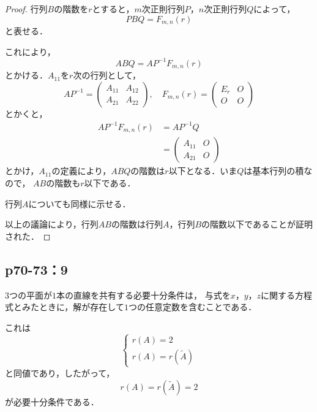 \documentclass[uplatex,dvipdfmx,a4paper,11pt,fleqn]{jsarticle}
\begin{document}
\begin{leftbar}
    \begin{proof}
        行列$B$の階数を$r$とすると，$m$次正則行列$P$，$n$次正則行列$Q$によって，
        \[
            P B Q = F_{m,n} (r)
        \]
        と表せる．

        これにより，
        \[
            ABQ = A P^{-1} F_{m,n} (r) 
        \]
        とかける．$A_{11}$を$r$次の行列として，
        \[
            A P^{-1} = \begin{pmatrix} A_{11} & A_{12} \\ A_{21} & A_{22} \end{pmatrix}, \quad F_{m,n} (r) = \begin{pmatrix} E_r & O \\ O & O \end{pmatrix}
        \]
        とかくと，
        \begin{align*}
           A P^{-1} F_{m,n} (r)&= A P^{-1} Q \\
           & = \begin{pmatrix} A_{11}& O \\ A_{21} & O \end{pmatrix}
        \end{align*}
        とかけ，$A_{11}$の定義により，$ABQ$の階数は$r$以下となる．いま$Q$は基本行列の積なので， $AB$の階数も$r$以下である．

        行列$A$についても同様に示せる．
        
        以上の議論により，行列$AB$の階数は行列$A$，行列$B$の階数以下であることが証明された．

    \end{proof}
\end{leftbar}

\newpage 


\subsection*{p70-73：9}

\begin{tleftbar}
    $3$つの平面が$1$本の直線を共有する必要十分条件は，
    与式を$x$，$y$，$z$に関する方程式とみたときに，解が存在して$1$つの任意定数を含むことである．

    これは
    \[
        \begin{cases} 
            r(A)=2 \\
            r(A)=r(\tilde{A})
        \end{cases}
    \]
    と同値であり，したがって，
    \[
        r(A)=r(\tilde{A})=2
    \]
    が必要十分条件である．
    \end{tleftbar}
\end{document}
